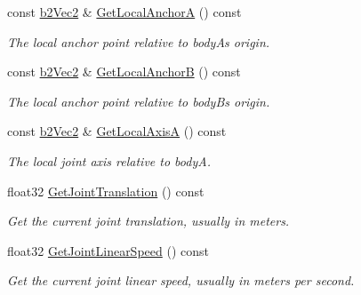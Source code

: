 \begin{DoxyCompactItemize}
const \mbox{\hyperlink{structb2Vec2}{b2\+Vec2}} \& \mbox{\hyperlink{classb2WheelJoint_aaf132c39227962a0b0788558e7dd6662}{Get\+Local\+AnchorA}} () const
\begin{DoxyCompactList}\small\item\em The local anchor point relative to bodyA\textquotesingle{}s origin. \end{DoxyCompactList}\item 
\mbox{\label{classb2WheelJoint_a78c56833f42bfc61998aa5ea8c876f3e}} 
const \mbox{\hyperlink{structb2Vec2}{b2\+Vec2}} \& \mbox{\hyperlink{classb2WheelJoint_a78c56833f42bfc61998aa5ea8c876f3e}{Get\+Local\+AnchorB}} () const
\begin{DoxyCompactList}\small\item\em The local anchor point relative to bodyB\textquotesingle{}s origin. \end{DoxyCompactList}\item 
\mbox{\label{classb2WheelJoint_a86bf4dbf356f9095c05d62313810e602}} 
const \mbox{\hyperlink{structb2Vec2}{b2\+Vec2}} \& \mbox{\hyperlink{classb2WheelJoint_a86bf4dbf356f9095c05d62313810e602}{Get\+Local\+AxisA}} () const
\begin{DoxyCompactList}\small\item\em The local joint axis relative to bodyA. \end{DoxyCompactList}\item 
\mbox{\label{classb2WheelJoint_a4cebb70f659344d5d93c1885d47000e3}} 
float32 \mbox{\hyperlink{classb2WheelJoint_a4cebb70f659344d5d93c1885d47000e3}{Get\+Joint\+Translation}} () const
\begin{DoxyCompactList}\small\item\em Get the current joint translation, usually in meters. \end{DoxyCompactList}\item 
\mbox{\label{classb2WheelJoint_a3cbdc95c55c9bf5b9f2b46b05fc2a5e5}} 
float32 \mbox{\hyperlink{classb2WheelJoint_a3cbdc95c55c9bf5b9f2b46b05fc2a5e5}{Get\+Joint\+Linear\+Speed}} () const
\begin{DoxyCompactList}\small\item\em Get the current joint linear speed, usually in meters per second. \end{DoxyCompactList}\item 

\end{DoxyCompactItemize}
